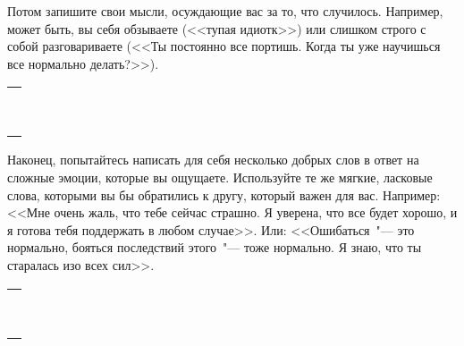 \begin{itemize}
	\itemWritingHand Потом запишите свои мысли, осуждающие вас за то, что случилось. Например, может быть, вы себя обзываете (<<тупая идиотк>>) или слишком строго с собой разговариваете (<<Ты постоянно все портишь. Когда ты уже научишься все нормально делать?>>).
\end{itemize}

\setlength{\extrarowheight}{2mm}
\begin{tabularx}{\textwidth}{X}
	\\
	\arrayrulecolor{gray}\hline\\
	\hline\\
	\hline\\
	\hline\\
	\hline\\
	\hline\\
	\hline\\
	\hline\\
	\hline\\
	\hline\\	
\end{tabularx}
\setlength{\extrarowheight}{0mm}

\begin{itemize}
	\itemWritingHand Наконец, попытайтесь написать для себя несколько добрых слов в ответ на сложные эмоции, которые вы ощущаете. Используйте те же мягкие, ласковые слова, которыми вы бы обратились к другу, который важен для вас. Например: <<Мне очень жаль, что тебе сейчас страшно. Я уверена, что все будет хорошо, и я готова тебя поддержать в любом случае>>. Или: <<Ошибаться~"--- это нормально, бояться последствий этого~"--- тоже нормально. Я знаю, что ты старалась изо всех сил>>.
\end{itemize}

\setlength{\extrarowheight}{2mm}
\begin{tabularx}{\textwidth}{X}
	\\
	\arrayrulecolor{gray}\hline\\
	\hline\\
	\hline\\
	\hline\\
	\hline\\
	\hline\\
	\hline\\
	\hline\\
	\hline\\
	\hline\\	
\end{tabularx}
\setlength{\extrarowheight}{0mm}

